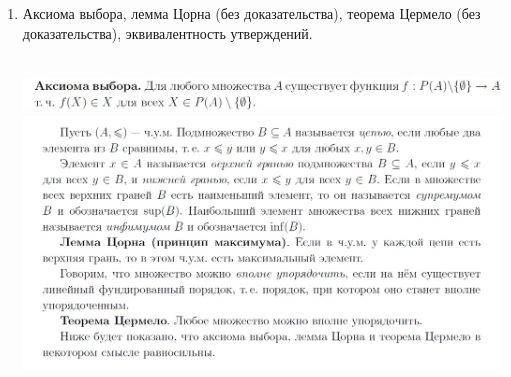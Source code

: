 \documentclass[a4paper]{article}
\newtheorem*{theorem*}{Теорема}
\theoremstyle{definition}
\begin{document}
\begin{enumerate}
\begin{theorem*}[о сравнимости в.у.м.]
        Если даны два в.у.м., то одно из них изоморфно начальному сегменту другого.
       \end{theorem*}
 \item Аксиома выбора, лемма Цорна (без доказательства), теорема Цермело (без доказательства), эквивалентность утверждений.
       \begin{flushright}
        \mbox{}\\ \includegraphics[scale=0.4]{15_1.jpg}\\
        \includegraphics[scale=0.4]{15_2.jpg}\\
       \end{flushright}


\end{enumerate}
\end{document}
